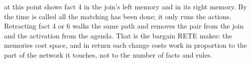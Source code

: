 at this point shows fact 4 in the join's
left memory and  in its right memory. By the time  is
called all the matching has been done; it only runs the actions.
Retracting fact 4 or 6 walks the same path and removes the pair from the
join and the activation from the agenda. That is the bargain RETE makes:
the memories cost space, and in return each change costs work in
proportion to the part of the network it touches, not to the number of
facts and rules.
